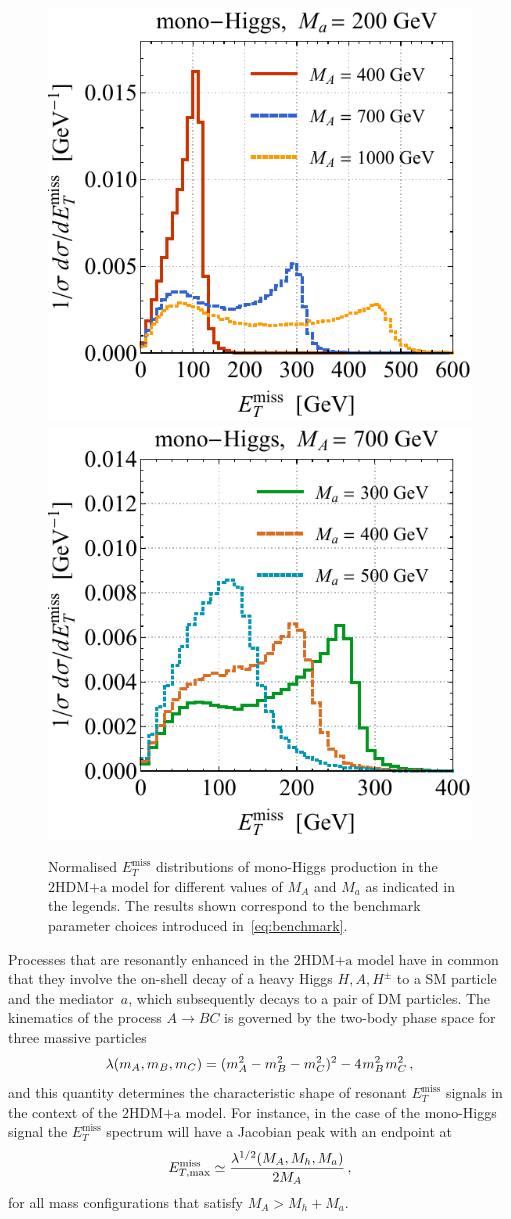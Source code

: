 \documentclass[review]{elsarticle}
\newcommand{\MET}{\ensuremath{E_T^\mathrm{miss}}\xspace}
\newcommand{\mA}{\ensuremath{M_{A}}\xspace}
\newcommand{\ma}{\ensuremath{M_{a}}\xspace}
\newcommand{\hdma}{\ensuremath{\textrm{2HDM+a}}\xspace}
\begin{document}
\begin{figure}[t!]
\centering
\includegraphics[height=0.45\textwidth]{hmetspecl.pdf}	\qquad 
\includegraphics[height=0.45\textwidth]{hmetspecr.pdf}
\vspace{2mm}
\caption{\label{fig:hMET} Normalised $\MET$ distributions of mono-Higgs production in the \hdma model for different values of $\mA$ and $\ma$ as indicated in the legends. The  results shown correspond to the benchmark parameter choices introduced in~\eqref{eq:benchmark}. }  
\end{figure}

Processes that are resonantly enhanced in the \hdma model have in common that they involve the on-shell decay of a heavy Higgs $H,A,H^\pm$ to a SM particle and the mediator~$a$, which    subsequently decays to a pair of DM particles. The kinematics of the process $A \to B C$ is governed by the two-body phase space for three massive particles 
\begin{equation} \label{eq:twophasespace}
\lambda(m_A, m_B, m_C) = (m_A^2 -m_B^2-m_C^2)^2 -  4 \hspace{0.25mm} m_B^2 \hspace{0.25mm}  m_C^2 \,,
\end{equation}
and this quantity determines the characteristic shape of resonant $\MET$ signals in the context of the \hdma model. For instance, in the case of the mono-Higgs signal the $\MET$ spectrum  will have a Jacobian peak with an endpoint at~\cite{No:2015xqa,Bauer:2017ota}
\begin{equation} \label{eq:monoHMETpeak}
E^{\rm{miss}}_{T, {\rm max} } \simeq \frac{\lambda^{1/2}(M_A, M_h, M_a)}{2 M_A}\,, 
\end{equation}
for all mass configurations that satisfy $M_A > M_h + M_a$. 
\end{document}
